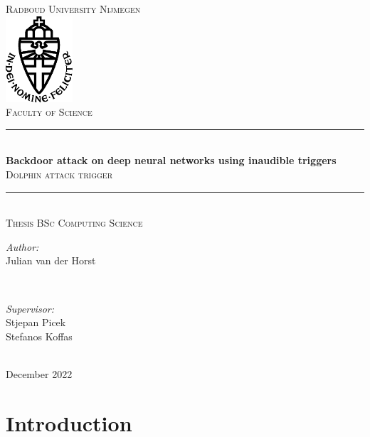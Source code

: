 \documentclass{article}
\title{\thesistitle}
\author{\thesisauthorfirst\space\thesisauthorsecond}
\date{\thesisdate}
\def\thesistitle{Backdoor attack on deep neural networks using inaudible triggers}
\def\thesissubtitle{Dolphin attack trigger}
\def\thesisauthorfirst{Julian van der Horst}
\def\thesisauthorsecond{}
\def\thesissupervisorfirst{Stjepan Picek\\Stefanos Koffas}
\def\thesissupervisorsecond{}
\def\thesissecondreaderfirst{}
\def\thesissecondreadersecond{}
\def\thesisdate{December 2022}
\theoremstyle{definition}
\theoremstyle{remark}
\begin{document}
\begin{titlepage}
	\thispagestyle{empty}
	\newcommand{\HRule}{\rule{\linewidth}{0.5mm}}
	\center
	\textsc{\Large Radboud University Nijmegen}\\[.7cm]
	\includegraphics[width=25mm]{img/in_dei_nomine_feliciter.eps}\\[.5cm]
	\textsc{Faculty of Science}\\[0.5cm]
	
	\HRule \\[0.4cm]
	{ \huge \bfseries \thesistitle}\\[0.1cm]
	\textsc{\thesissubtitle}\\
	\HRule \\[.5cm]
	\textsc{\large Thesis BSc Computing Science}\\[.5cm]
	
	\begin{minipage}{0.4\textwidth}
	\begin{flushleft} \large
	\emph{Author:}\\
	\thesisauthorfirst\space \textsc{\thesisauthorsecond}
	\end{flushleft}
	\end{minipage}
	~
	\begin{minipage}{0.4\textwidth}
	\begin{flushright} \large
	\emph{Supervisor:} \\
	\thesissupervisorfirst\space \textsc{\thesissupervisorsecond} \\[1em]
	\end{flushright}
	\end{minipage}\\[4cm]
	\vfill
	{\large \thesisdate}\\
	\clearpage
\end{titlepage}

\tableofcontents

\newpage
\section{Introduction}
\end{document}
